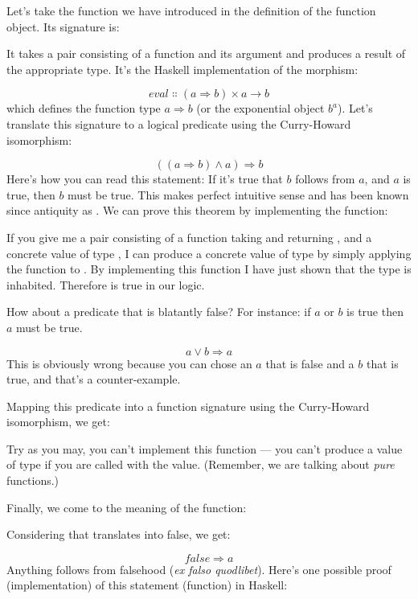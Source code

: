 Let's take the function  we have introduced in the
definition of the function object. Its signature is:

It takes a pair consisting of a function and its argument and produces a
result of the appropriate type. It's the Haskell implementation of the
morphism:

\[eval \Colon (a \Rightarrow b) \times a \to b\]
which defines the function type $a \Rightarrow b$ (or the exponential object
$b^{a}$). Let's translate this signature to a logical predicate
using the Curry-Howard isomorphism:

\[((a \Rightarrow b) \wedge a) \Rightarrow b\]
Here's how you can read this statement: If it's true that $b$
follows from $a$, and $a$ is true, then $b$ must be
true. This makes perfect intuitive sense and has been known since
antiquity as . We can prove this theorem by
implementing the function:

If you give me a pair consisting of a function  taking
 and returning , and a concrete value  of
type , I can produce a concrete value of type  by
simply applying the function  to . By implementing
this function I have just shown that the type
 is inhabited.
Therefore  is true in our logic.

How about a predicate that is blatantly false? For instance: if
$a$ or $b$ is true then $a$ must be true.

\[a \vee b \Rightarrow a\]
This is obviously wrong because you can chose an $a$ that is
false and a $b$ that is true, and that's a counter-example.

Mapping this predicate into a function signature using the Curry-Howard
isomorphism, we get:

Try as you may, you can't implement this function --- you can't produce
a value of type  if you are called with the 
value. (Remember, we are talking about \emph{pure} functions.)

Finally, we come to the meaning of the  function:

Considering that  translates into false, we get:

\[false \Rightarrow a\]
Anything follows from falsehood (\emph{ex falso quodlibet}). Here's one
possible proof (implementation) of this statement (function) in Haskell:

